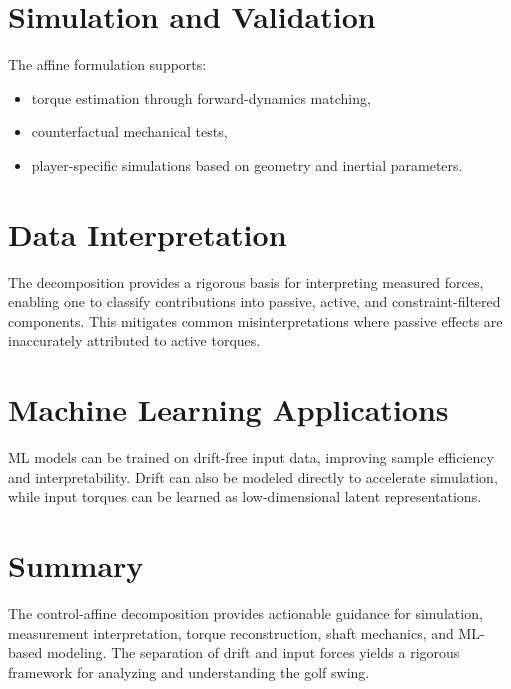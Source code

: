 \documentclass[12pt]{article}
\begin{document}
\section{Simulation and Validation}
The affine formulation supports:
\begin{itemize}
\item torque estimation through forward-dynamics matching,
\item counterfactual mechanical tests,
\item player-specific simulations based on geometry and inertial parameters.
\end{itemize}

\section{Data Interpretation}
The decomposition provides a rigorous basis for interpreting measured forces, enabling one to classify contributions into passive, active, and constraint-filtered components. This mitigates common misinterpretations where passive effects are inaccurately attributed to active torques.

\section{Machine Learning Applications}
ML models can be trained on drift-free input data, improving sample efficiency and interpretability. Drift can also be modeled directly to accelerate simulation, while input torques can be learned as low-dimensional latent representations.

\section{Summary}
The control-affine decomposition provides actionable guidance for simulation, measurement interpretation, torque reconstruction, shaft mechanics, and ML-based modeling. The separation of drift and input forces yields a rigorous framework for analyzing and understanding the golf swing.
\end{document}
